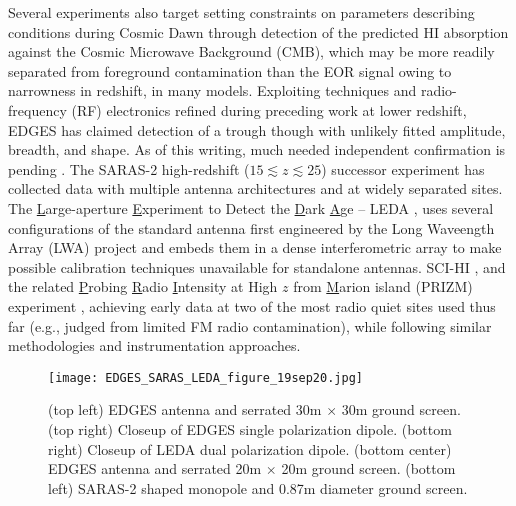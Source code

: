 Several experiments also target setting constraints on parameters describing conditions during Cosmic Dawn through detection of the predicted HI absorption against the Cosmic Microwave Background (CMB), which may be more readily separated from foreground contamination than the EOR signal owing to narrowness in redshift, in many models.  Exploiting techniques and radio-frequency (RF) electronics refined during  preceding work at lower redshift, EDGES has claimed detection of a trough \cite{bowman18} though with unlikely fitted amplitude, breadth, and shape.  As of this writing, much needed independent confirmation is pending \cite{greenhill18,hills18,bradley19,spinelli19}.  The SARAS-2 high-redshift ($15\lesssim z \lesssim 25$) successor experiment \cite{singh17,singh18} has collected data with multiple antenna architectures and at widely separated sites.  The {\underline L}arge-aperture {\underline E}xperiment to Detect the {\underline D}ark {\underline A}ge -- LEDA \cite{greenhill12,price18}, uses several configurations of the standard antenna first engineered by the Long Waveength Array (LWA) project \cite{taylor12} and embeds them in a dense interferometric array to make possible calibration techniques  unavailable for standalone antennas.  SCI-HI \cite{voytek14}, and  the related {\underline P}robing {\underline R}adio {\underline I}ntensity at High $z$ from {\underline M}arion island (PRIZM) experiment \cite{philip19}, achieving early data at two of the most radio quiet sites used thus far (e.g., judged from limited FM radio contamination), while following similar methodologies and instrumentation approaches.
\
\begin{figure}[htb]
\begin{center}
\hspace*{-0.15in}\texttt{[image: EDGES\_SARAS\_LEDA\_figure\_19sep20.jpg]}
\end{center}
\caption{(top left) EDGES antenna and serrated 30m $\times$ 30m ground screen.  (top right) Closeup of EDGES single polarization dipole.  (bottom right) Closeup of LEDA dual polarization dipole.  (bottom center) EDGES antenna and serrated 20m $\times$ 20m ground screen. (bottom left) SARAS-2 shaped monopole and 0.87m diameter ground screen.}
\end{figure}





